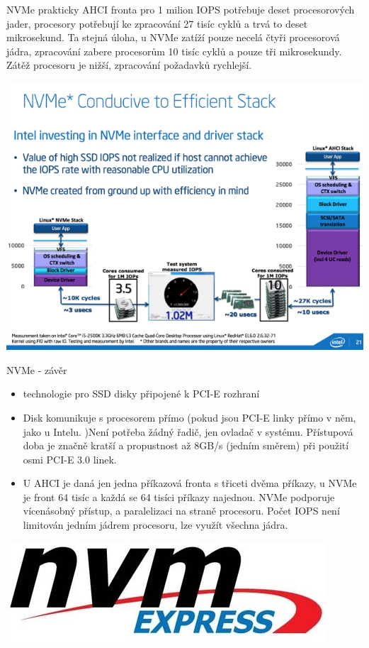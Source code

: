 \documentclass[aspectratio=43]{beamer}
\begin{document}
\begin{frame}{NVMe prakticky}
	AHCI fronta pro 1 milion IOPS potřebuje deset procesorových jader, procesory potřebují ke zpracování 27 tisíc cyklů a trvá to deset mikrosekund. Ta stejná úloha, u NVMe zatíží pouze necelá 
	čtyři procesorová jádra, zpracování zabere procesorům 10 tisíc cyklů a pouze tři mikrosekundy. Zátěž procesoru je nižší, zpracování požadavků rychlejší.
	\begin{center}
		\includegraphics[width=0.6\linewidth]{extrahovane_obrazky/img_2_page34_0.png}
	\end{center}
	
\end{frame}


\begin{frame}{NVMe - závěr}
	\begin{itemize}
		\item technologie pro SSD disky připojené k PCI-E rozhraní
		\item Disk komunikuje s procesorem přímo (pokud jsou PCI-E linky přímo v něm, jako u Intelu. )Není potřeba žádný řadič, jen ovladač v systému. Přístupová doba je značně kratší a propustnost až 8GB/s (jedním směrem) při použití osmi PCI-E 3.0 linek.
		\item U AHCI je daná jen jedna příkazová fronta s třiceti dvěma příkazy, u NVMe je front 64 tisíc a každá se 64 tisíci příkazy najednou. NVMe podporuje vícenásobný přístup, a paralelizaci na straně procesoru. Počet IOPS není limitován jedním jádrem procesoru, lze využít všechna jádra.
	\end{itemize}
	
	\begin{center}
		\includegraphics[width=0.6\linewidth]{extrahovane_obrazky/img_2_page35_0.jpeg}
	\end{center}
	
\end{frame}
\end{document}
